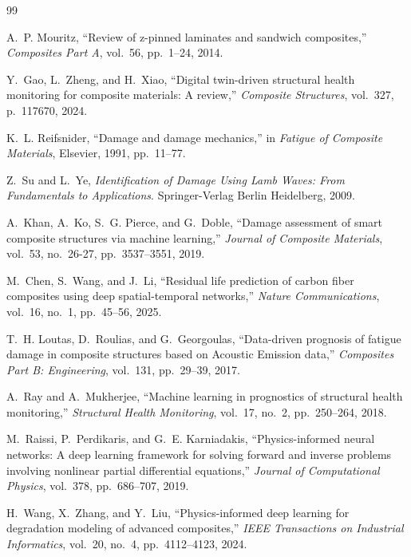 \documentclass[conference]{IEEEtran}
\begin{document}

\begin{thebibliography}{99}

A.~P. Mouritz, ``Review of z-pinned laminates and sandwich composites,'' \emph{Composites Part A}, vol.~56, pp.~1--24, 2014.

Y.~Gao, L.~Zheng, and H.~Xiao, ``Digital twin-driven structural health monitoring for composite materials: A review,'' \emph{Composite Structures}, vol.~327, p.~117670, 2024.

K.~L. Reifsnider, ``Damage and damage mechanics,'' in \emph{Fatigue of Composite Materials}, Elsevier, 1991, pp.~11--77.

Z.~Su and L.~Ye, \emph{Identification of Damage Using Lamb Waves: From Fundamentals to Applications}. Springer-Verlag Berlin Heidelberg, 2009.

A.~Khan, A.~Ko, S.~G. Pierce, and G.~Doble, ``Damage assessment of smart composite structures via machine learning,'' \emph{Journal of Composite Materials}, vol.~53, no.~26-27, pp.~3537--3551, 2019.

M.~Chen, S.~Wang, and J.~Li, ``Residual life prediction of carbon fiber composites using deep spatial-temporal networks,'' \emph{Nature Communications}, vol.~16, no.~1, pp.~45--56, 2025.

T.~H. Loutas, D.~Roulias, and G.~Georgoulas, ``Data-driven prognosis of fatigue damage in composite structures based on Acoustic Emission data,'' \emph{Composites Part B: Engineering}, vol.~131, pp.~29--39, 2017.

A.~Ray and A.~Mukherjee, ``Machine learning in prognostics of structural health monitoring,'' \emph{Structural Health Monitoring}, vol.~17, no.~2, pp.~250--264, 2018.

M.~Raissi, P.~Perdikaris, and G.~E. Karniadakis, ``Physics-informed neural networks: A deep learning framework for solving forward and inverse problems involving nonlinear partial differential equations,'' \emph{Journal of Computational Physics}, vol.~378, pp.~686--707, 2019.

H.~Wang, X.~Zhang, and Y.~Liu, ``Physics-informed deep learning for degradation modeling of advanced composites,'' \emph{IEEE Transactions on Industrial Informatics}, vol.~20, no.~4, pp.~4112--4123, 2024.


\end{thebibliography}
\end{document}
